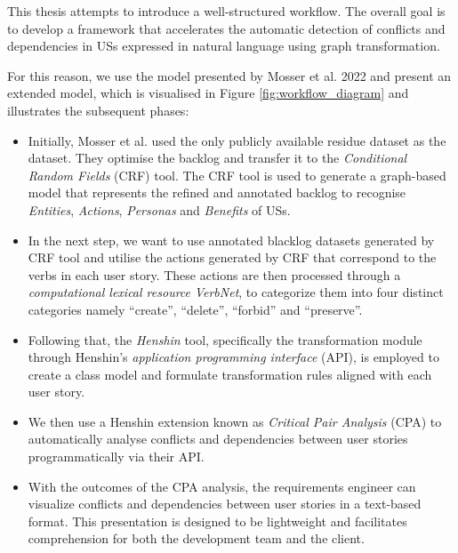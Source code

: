 This thesis attempts to introduce a well-structured workflow. The overall goal is to develop a framework that accelerates the automatic detection of conflicts and dependencies in USs expressed in natural language using graph transformation.

For this reason, we use the model presented by Mosser et al. 2022 and present an extended model, which is visualised in Figure \ref{fig:workflow_diagram} and illustrates the subsequent phases:
\begin{itemize}
\item Initially, Mosser et al. used the only publicly available residue dataset as the dataset\cite{requirementsdatasets}. They optimise the backlog and transfer it to the \emph{Conditional Random Fields} (CRF) tool. The CRF tool is used to generate a graph-based model that represents the refined and annotated backlog to recognise \emph{Entities}, \emph{Actions}, \emph{Personas} and \emph{Benefits} of USs\cite{mosser2022modelling}.
\item In the next step, we want to use annotated blacklog datasets generated by CRF tool and utilise the actions generated by CRF that correspond to the verbs in each user story. These actions are then processed through a \emph{computational lexical resource} \emph{VerbNet}, to categorize them into four distinct categories namely \enquote{create}, \enquote{delete}, \enquote{forbid} and \enquote{preserve}.
\item Following that, the \emph{Henshin} tool, specifically the transformation module through Henshin's \emph{application programming interface} (API), is employed to create a class model and formulate transformation rules aligned with each user story.
\item We then use a Henshin extension known as \emph{Critical Pair Analysis} (CPA) to automatically analyse conflicts and dependencies between user stories programmatically via their API.
\item With the outcomes of the CPA analysis, the requirements engineer can visualize conflicts and dependencies between user stories in a text-based format. This presentation is designed to be lightweight and facilitates comprehension for both the development team and the client.
\end{itemize}
